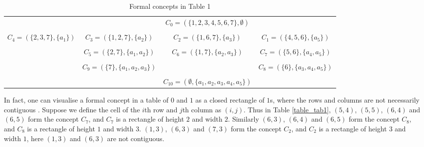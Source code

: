 \documentclass[11pt]{article}
\numberwithin{equation}{subsection}
\begin{document}
 \begin{table*}[ht]
            \begin{center}
                \begin{scriptsize}
                \caption{Formal concepts in  Table 1}
                    \label{table_2tab}
                    \begin{tabular}
                        {c c c c  }
                        \hline
                             &        &  $C_0=(\{1,2,3,4,5,6,7\},\emptyset)$  &       \ \ \  \\

                   &    &     &        \\

 $C_4=(\{2,3,7\},\{a_1\}) $ & $C_3=(\{1,2,7\},\{a_2\}) $   & $C_2=(\{1,6,7\},\{a_3\}) $  &  $C_1=(\{4,5,6\},\{a_5\}) $     \\

   &    &     &         \\

  & $C_5=(\{2,7\},\{a_1, a_2\}) $  &  $C_6=(\{1,7\},\{a_2, a_3\}) $   & $C_7=(\{5,6\},\{a_4, a_5\}) $      \\

  &    &     &         \\

  &  $C_9=(\{7\},\{a_1, a_2, a_3\}) $ &    &  $C_8=(\{6\},\{a_3, a_4, a_5\}) $    \\

   &    &     &         \\

 &  &    $C_{10}=(\emptyset,\{a_1, a_2, a_3 ,a_4, a_5\}) $   &      \\
\hline


                    \end{tabular}
                \end{scriptsize}
            \end{center}
        \end{table*}


  In fact, one can visualise a formal concept in a  table of $0$ and $1$  as a closed rectangle of $1$s, where the rows and columns  are not necessarily contiguous \cite{Andrews}.
  Suppose we define the cell of the $i$th row and $j$th column as $(i,j)$. Thus in Table \ref{table_tab1}, $(5,4)$, $(5,5)$, $(6,4)$ and $(6,5)$ form the concept $C_7$, and $C_7$ is a rectangle of height $2$ and width $2$. Similarly $(6,3)$, $(6,4)$ and $(6,5)$ form the concept $C_8$, and $C_8$ is a rectangle of height $1$ and width $3$.  $(1,3)$, $(6,3)$ and $(7,3)$ form the concept $C_2$, and $C_2$ is a rectangle of height $3$ and width $1$, here $(1,3)$ and $(6,3)$ are not contiguous.
\end{document}
